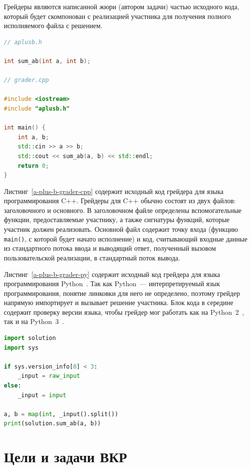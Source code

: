 \documentclass[times,specification,annotation]{style/itmo-student-thesis/itmo-student-thesis}
\begin{document}
Грейдеры являются написанной жюри (автором задачи) частью исходного кода, который будет скомпонован с реализацией участника для получения полного исполняемого файла с решением.

\begin{lstlisting}[float=!h,caption={Пример грейдера для языка C++},label={a-plus-b-grader-cpp},language=c++]
// aplusb.h

int sum_ab(int a, int b);

// grader.cpp

#include <iostream>
#include "aplusb.h"
 
int main() {
    int a, b;
    std::cin >> a >> b;
    std::cout << sum_ab(a, b) << std::endl;
    return 0;
}
\end{lstlisting}

Листинг~\ref{a-plus-b-grader-cpp} содержит исходный код грейдера для языка программирования C++. Грейдеры для C++ обычно состоят из двух файлов: заголовочного и основного. В заголовочном файле определены вспомогательные функции, предоставляемые участнику, а также сигнатуры функций, которые участник должен реализовать. Основной файл содержит точку входа (функцию \texttt{main()}, с которой будет начато исполнение) и код, считывающий входные данные из стандартного потока ввода и выводящий ответ, полученный вызовом пользовательской реализации, в стандартный поток вывода.

Листинг~\ref{a-plus-b-grader-py} содержит исходный код грейдера для языка программирования Python~\cite{python3docs}. Так как Python~--- интерпретируемый язык программирования, понятие линковки для него не определено, поэтому грейдер напрямую импортирует и вызывает решение участника. Блок кода в середине содержит проверку версии языка, чтобы грейдер мог работать как на Python~2~\cite{python2docs}, так и на Python~3~\cite{python3docs}.

\begin{lstlisting}[caption={Пример грейдера для языка Python},label={a-plus-b-grader-py},language=python]
import solution
import sys

if sys.version_info[0] < 3:
    _input = raw_input
else:
    _input = input
 
a, b = map(int, _input().split())
print(solution.sum_ab(a, b))
\end{lstlisting}

\section{Цели и задачи ВКР}
\end{document}
